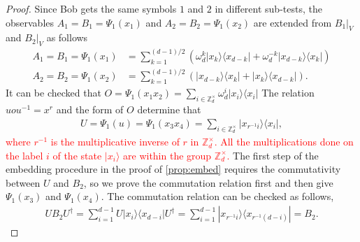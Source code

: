 \documentclass[11pt,letterpaper]{article}
\newcommand{\ket}[1]{|#1\rangle}
\newcommand{\ketbra}[2]{|#1\rangle\langle#2|}
\newcommand{\ct}{^{\dagger}}
\newcommand{\Z}{\mathbb{Z}}
\newcommand{\Zd}{\Z_d^{\times}}
\newcommand{\1}{\mathbb{1}}
\newcommand{\hf}[1]{\textcolor{red}{#1}}
\theoremstyle{definition}
\begin{document}
\begin{proof}
Since Bob gets the same symbols $1$ and $2$ in different sub-tests, 
the observables $A_1 = B_1 = \Psi_1(x_1)$ and $A_2 = B_2 = \Psi_1(x_2)$ are extended from $B_1|_V$ and $B_2|_V$ as follows
\begin{align}
	A_1 = B_1 = \Psi_1(x_1) &= \sum_{k=1}^{(d-1)/2}\left( \omega_d^k\ketbra{x_k}{x_{d-k}} + \omega_d^{-k}\ketbra{x_{d-k}}{x_k}\right)\\
	A_2 = B_2 = \Psi_1(x_2) &= \sum_{k=1}^{(d-1)/2}\left(\ketbra{x_{d-k}}{x_k} + \ketbra{x_k}{x_{d-k}}\right).
\end{align}
It can be checked that $O = \Psi_1(x_1x_2) = \sum_{i \in \Zd} \omega_d^i \ketbra{x_i}{x_i}$ 
The relation $uou^{-1} = x^r$ and the form of $O$ determine that 
\begin{align}
	U =\Psi_1(u) = \Psi_1(x_3x_4) =  \sum_{i \in \Zd} \ketbra{x_{r^{-1}i}}{x_i},
\end{align}
\hf{where $r^{-1}$ is the multiplicative inverse of $r$ in $\Zd$.
All the multiplications done on the label $i$ of the state $\ket{x_i}$ are within the group $\Zd$.}
The first step of the embedding procedure in the proof of \cref{prop:embed} requires
the commutativity between $U$ and $B_2$, so we prove the commutation relation first and
then give $\Psi_1(x_3)$ and $\Psi_1(x_4)$.
The commutation relation can be checked as follows,
\begin{align}
	UB_2U\ct = \sum_{i=1}^{d-1} U\ketbra{x_i}{x_{d-i}}U\ct = \sum_{i=1}^{d-1} \ketbra{x_{r^{-1} i}}{x_{r^{-1}(d-i)}} =B_2.
\end{align}


\end{proof}
\end{document}
